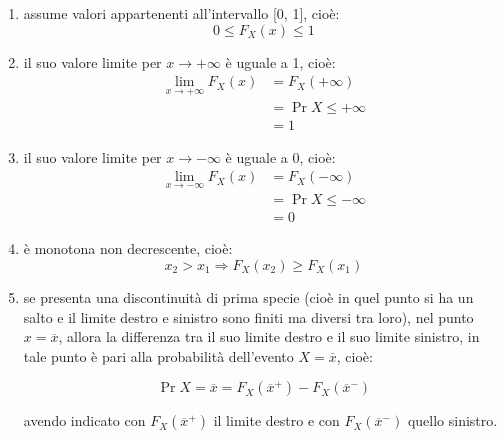 \begin{enumerate}
    \item assume valori appartenenti all'intervallo [0, 1], cioè:
    {
        \Large 
        \begin{equation}
            0 \leq F_X (x) \leq 1
        \end{equation}
    }

    \item il suo valore limite per $x \rightarrow +\infty$ è uguale a 1, cioè: 
    {
        \Large 
        \begin{equation}
            \begin{split}
                \lim_{x \rightarrow +\infty} 
                F_X (x) 
                &= 
                F_X (+\infty) 
                \\ 
                &= 
                \Pr{X \leq +\infty} 
                \\ 
                &= 
                1
            \end{split}
        \end{equation}
    } 

    \item il suo valore limite per $x \rightarrow -\infty$ è uguale a 0, cioè: 
    {
        \Large 
        \begin{equation}
            \begin{split}
                \lim_{x \rightarrow -\infty} 
                F_X (x) 
                &= 
                F_X (-\infty) 
                \\ 
                &= 
                \Pr{X \leq -\infty} 
                \\ 
                &= 
                0
            \end{split}
        \end{equation}
    }

    \item è monotona non decrescente, cioè: 
    {
        \Large 
        \begin{equation}
            x_2 > x_1 \Rightarrow F_X (x_2) \geq F_X (x_1)
        \end{equation}
    } 

    \item se presenta una discontinuità di prima specie (cioè in quel punto si ha un salto e il limite destro e sinistro sono finiti ma diversi tra loro), 
    nel punto $x = \overline{x}$, allora la differenza tra il suo limite destro e il suo limite sinistro, 
    in tale punto è pari alla probabilità dell'evento $X = \overline{x}$, cioè: 
    
    {
        \Large 
        \begin{equation}
        \Pr{X = \overline{x}} 
        = 
        F_X(\overline{x}^{+})
        - 
        F_X(\overline{x}^{-})
        \end{equation}
    }

    avendo indicato con $F_X(\overline{x}^{+})$ il limite destro  
    e con $F_X(\overline{x}^{-})$ quello sinistro.
\end{enumerate}

